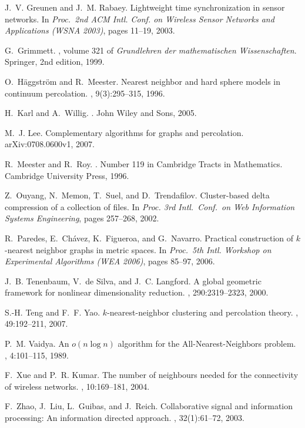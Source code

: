 \documentclass[11pt]{article}
\begin{document}
\begin{thebibliography}{10}
J.~V. Greunen and J.~M. Rabaey.
\newblock Lightweight time synchronization in sensor networks.
\newblock In {\em Proc.~2nd ACM Intl. Conf. on Wireless Sensor Networks and
  Applications (WSNA 2003)}, pages 11--19, 2003.

G.~Grimmett.
, volume 321 of {\em Grundlehren der mathematischen
  Wissenschaften}.
\newblock Springer, 2nd edition, 1999.

O.~H\"aggstr\"om and R.~Meester.
\newblock Nearest neighbor and hard sphere models in continuum percolation.
, 9(3):295--315, 1996.

H.~Karl and A.~Willig.
.
\newblock John Wiley and Sons, 2005.

M.~J. Lee.
\newblock Complementary algorithms for graphs and percolation.
\newblock arXiv:0708.0600v1, 2007.

R.~Meester and R.~Roy.
.
\newblock Number 119 in Cambridge Tracts in Mathematics. Cambridge University
  Press, 1996.

Z.~Ouyang, N.~Memon, T.~Suel, and D.~Trendafilov.
\newblock Cluster-based delta compression of a collection of files.
\newblock In {\em Proc. 3rd Intl.\ Conf.\ on Web Information Systems
  Engineering}, pages 257--268, 2002.

R.~Paredes, E.~Ch\'avez, K.~Figueroa, and G.~Navarro.
\newblock Practical construction of $k$-nearest neighbor graphs in metric
  spaces.
\newblock In {\em Proc.~5th Intl. Workshop on Experimental Algorithms (WEA
  2006)}, pages 85--97, 2006.

J.~B. Tenenbaum, V.~{de Silva}, and J.~C. Langford.
\newblock A global geometric framework for nonlinear dimensionality reduction.
, 290:2319--2323, 2000.

S.-H. Teng and F.~F. Yao.
\newblock $k$-nearest-neighbor clustering and percolation theory.
, 49:192--211, 2007.

P.~M. Vaidya.
\newblock An $o(n \log n)$ algorithm for the {All-Nearest-Neighbors} problem.
, 4:101--115, 1989.

F.~Xue and P.~R. Kumar.
\newblock The number of neighbours needed for the connectivity of wireless
  networks.
, 10:169--181, 2004.

F.~Zhao, J.~Liu, L.~Guibas, and J.~Reich.
\newblock Collaborative signal and information processing: An information
  directed approach.
, 32(1):61--72, 2003.

\end{thebibliography}
\end{document}

